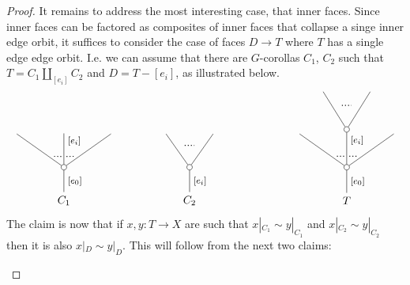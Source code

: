 \documentclass[a4paper,10pt
,draft
]{article}%
\renewcommand{\1}{\ensuremath{\mathbb{id}}}
\begin{document}
\begin{proof}
It remains to address the most interesting case,
that inner faces. Since inner faces can be factored as composites of inner faces that collapse a singe inner edge orbit,
it suffices to consider the case of faces
$D \to T$ where $T$ has a single edge edge orbit.
I.e. we can assume that there are $G$-corollas
$C_1$, $C_2$ such that 
$T = C_1 \amalg_{[e_i]} C_2$ and
$D = T - [e_i]$, as illustrated below.
\[
\begin{tikzpicture}
[grow=up,auto,level distance=3em,
every node/.style = {font=\footnotesize},
dummy/.style={circle,draw,inner sep=0pt,minimum size=1.75mm}]
	\node at (0,0) [font=\normalsize]{$C_1$}
		child{node [dummy] {}
			child{
			edge from parent node [swap,near end] {} node [near start,inner sep=1pt,name=Kn] {}}
			child[level distance=3.4em]{node {}
			edge from parent node [near end,swap] {$[e_i]$}
node [near start,inner sep=1pt,name=Kone,swap] {}
node [near start,inner sep=1pt,name=Kone1] {}}
			child{
			edge from parent node [near end] {}
node [swap] {}
node [near start,inner sep=1pt,name=Kn1,swap]{}}
		edge from parent node [swap] {$[e_0]$}
		};
		\draw [dotted,thick] (Kone) -- (Kn) ;
		\draw [dotted,thick] (Kone1) -- (Kn1) ;
	\node at (4,0) [font=\normalsize]{$C_2$}
		child{node [dummy] {}
			child{
			edge from parent node [swap,near end] {} node [name=Kn] {}}
			child{
			edge from parent node [near end] {}
node [name=Kone,swap] {}}
		edge from parent node [swap] {$[e_i]$}
		};
		\draw [dotted,thick] (Kone) -- (Kn) ;
	\node at (9,0) [font=\normalsize]{$T$}
		child{node [dummy] {}
			child{
			edge from parent node [swap,near end] {} node [near start,inner sep=1pt,name=Kn] {}}
			child[level distance=3.4em]{node [dummy] {}
				child{
				edge from parent node [swap,near end] {} node [name=Kn2] {}}
				child{
				edge from parent node [near end] {}
node [name=Kone2,swap] {}}
			edge from parent node [near end,swap] {$[e_i]$}
node [near start,inner sep=1pt,name=Kone,swap] {}
node [near start,inner sep=1pt,name=Kone1] {}}
			child{
			edge from parent node [near end] {}
node [swap] {}
node [near start,inner sep=1pt,name=Kn1,swap]{}}
		edge from parent node [swap] {$[e_0]$}
		};
		\draw [dotted,thick] (Kone) -- (Kn) ;
		\draw [dotted,thick] (Kone1) -- (Kn1) ;
		\draw [dotted,thick] (Kone2) -- (Kn2) ;
\end{tikzpicture}
\]
The claim is now that if
$x,y \colon T \to X$ are such that
$x|_{C_1} \sim y|_{C_1}$ and
$x|_{C_2} \sim y|_{C_2}$
then it is also 
$x|_{D} \sim y|_{D}$.
This will follow from the next two claims:
\begin{itemize}

\end{itemize}
\end{proof}
\end{document}
